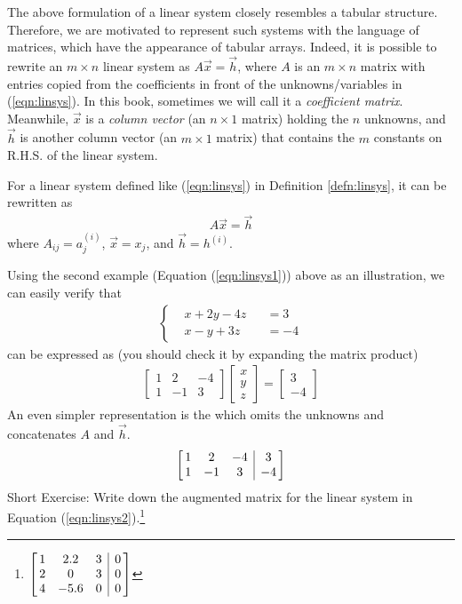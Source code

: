 The above formulation of a linear system closely resembles a tabular structure. Therefore, we are motivated to represent such systems with the language of matrices, which have the appearance of tabular arrays. Indeed, it is possible to rewrite an $m \times n$ linear system as $A\vec{x} = \vec{h}$, where $A$ is an $m \times n$ matrix with entries copied from the coefficients in front of the unknowns/variables in (\ref{eqn:linsys}). In this book, sometimes we will call it a \textit{coefficient matrix}. Meanwhile, $\vec{x}$ is a \textit{column vector} (an $n \times 1$ matrix) holding the $n$ unknowns, and $\vec{h}$ is another column vector (an $m \times 1$ matrix) that contains the $m$ constants on R.H.S. of the linear system.
\begin{proper}
\label{proper:linsysmat}
For a linear system defined like (\ref{eqn:linsys}) in Definition \ref{defn:linsys}, it can be rewritten as 
\begin{align}
A\vec{x} = \vec{h}    
\end{align}
where $A_{ij} = a_{j}^{(i)}$, $\vec{x} = x_j$, and $\vec{h} = h^{(i)}$.
\end{proper}
Using the second example (Equation (\ref{eqn:linsys1})) above as an illustration, we can easily verify that
\begin{align*}
\left\{\begin{alignedat}{2}
&x + 2y - 4z& &= 3 \\
&x - y + 3z& &= -4
\end{alignedat}\right.
\end{align*}
can be expressed as (you should check it by expanding the matrix product)
\begin{align*}
\begin{bmatrix}
1 & 2 & -4 \\
1 & -1 & 3 
\end{bmatrix}
\begin{bmatrix}
x \\
y \\
z
\end{bmatrix}
=
\begin{bmatrix}
3 \\
-4
\end{bmatrix}
\end{align*}
An even simpler representation is the  which omits the unknowns and concatenates $A$ and $\vec{h}$.
\begin{equation*}
\left[\begin{array}{@{\,}ccc|c@{\,}}
1 & 2 & -4 & 3\\
1 & -1 & 3 & -4
\end{array}\right]
\end{equation*}
Short Exercise: Write down the augmented matrix for the linear system in Equation (\ref{eqn:linsys2}).\footnote{$
\left[\begin{array}{@{\,}ccc|c@{\,}}
1 & 2.2 & 3 & 0 \\
2 & 0 & 3 & 0 \\
4 & -5.6 & 0 & 0 \\
\end{array}\right]$}

